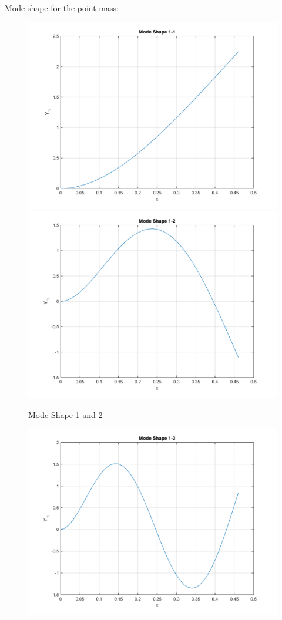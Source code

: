 \documentclass[14pt,a4paper]{article}
\begin{document}
\begin{enumerate}
	Mode shape for the point mass:
	\begin{figure}[htp]
		\centering
		\includegraphics[scale=0.4]{fn1_VB1_mode1.png}
		\includegraphics[scale=0.4]{fn1_VB1_mode2.png}
		\caption{Mode Shape 1 and 2}
	\end{figure}
	\begin{figure}[htp]
		\centering
		\includegraphics[scale=0.4]{fn1_VB1_mode3.png}

\end{figure}
\end{enumerate}
\end{document}
